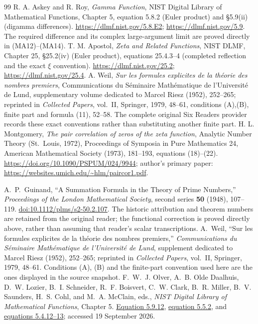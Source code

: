 \endgroup
\begin{thebibliography}{99}
 R. A. Askey and R. Roy, \emph{Gamma Function}, NIST Digital
Library of Mathematical Functions, Chapter 5, equation 5.8.2 (Euler product)
and \S5.9(ii) (digamma differences).
\url{https://dlmf.nist.gov/5.8.E2}; \url{https://dlmf.nist.gov/5.9}.
The required difference and its complex large-argument limit are proved
directly in (MA12)--(MA14).
 T. M. Apostol, \emph{Zeta and Related Functions}, NIST DLMF,
Chapter 25, \S25.2(iv) (Euler product), equations 25.4.3--4 (completed
reflection and the exact $\xi$ convention).
\url{https://dlmf.nist.gov/25.2}; \url{https://dlmf.nist.gov/25.4}.
 A. Weil, \emph{Sur les formules explicites de la th\'eorie
des nombres premiers}, Communications du S\'eminaire Math\'ematique de
l'Universit\'e de Lund, supplementary volume dedicated to Marcel Riesz
(1952), 252--265; reprinted in \emph{Collected Papers}, vol.~II,
Springer, 1979, 48--61, conditions (A),(B), finite part and formula (11),
52--58. The complete original Six Readers provider records these exact
conventions rather than substituting another finite part.
 H. L. Montgomery, \emph{The pair correlation of zeros
of the zeta function}, Analytic Number Theory (St.~Louis, 1972),
Proceedings of Symposia in Pure Mathematics 24, American Mathematical
Society (1973), 181--193, equations (18)--(22).
\url{https://doi.org/10.1090/PSPUM/024/9944}; author's primary paper:
\url{https://websites.umich.edu/~hlm/paircor1.pdf}.

A.~P.~Guinand, ``A Summation Formula in the Theory of Prime Numbers,''
\emph{Proceedings of the London Mathematical Society}, second series
\textbf{50} (1948), 107--119.
\href{https://doi.org/10.1112/plms/s2-50.2.107}{doi:10.1112/plms/s2-50.2.107}.
The historic attribution and theorem numbers are retained from the original
reader; the functional correction is proved directly above, rather than
assuming that reader's scalar transcriptions.
A.~Weil, ``Sur les formules explicites de la th\'eorie des nombres premiers,''
\emph{Communications du S\'eminaire Math\'ematique de l'Universit\'e de Lund},
supplement dedicated to Marcel Riesz (1952), 252--265; reprinted in
\emph{Collected Papers}, vol.~II, Springer, 1979, 48--61.
Conditions (A), (B) and the finite-part convention used here are the ones
displayed in the source snapshot.
F.~W.~J. Olver, A.~B. Olde Daalhuis, D.~W. Lozier, B.~I. Schneider,
R.~F. Boisvert, C.~W. Clark, B.~R. Miller, B.~V. Saunders, H.~S. Cohl,
and M.~A. McClain, eds., \emph{NIST Digital Library of Mathematical
Functions}, Chapter 5.
\href{https://dlmf.nist.gov/5.9.E12}{Equation 5.9.12},
\href{https://dlmf.nist.gov/5.5.E2}{equation 5.5.2}, and
\href{https://dlmf.nist.gov/5.4}{equations 5.4.12--13};
accessed 19 September 2026.

\end{thebibliography}
